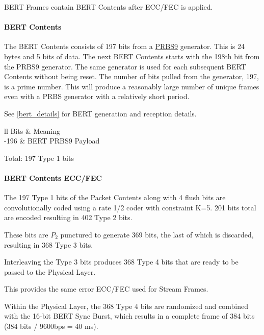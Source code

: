 \documentclass[a4paper,11pt,oneside]{book}
\begin{document}
BERT Frames contain BERT Contents after ECC/FEC is applied.

\paragraph{BERT Contents}

The BERT Contents consists of 197 bits from a \href{https://en.wikipedia.org/wiki/Pseudorandom_binary_sequence}{PRBS9} generator. This is 24 bytes and 5 bits of data. The next BERT Contents starts with the 198th bit from the PRBS9 generator. The same generator is used for each subsequent BERT Contents without being reset. The number of bits pulled from the generator, 197, is a prime number. This will produce a reasonably large number of unique frames even with a PRBS generator with a relatively short period.

See \autoref{bert_details} for BERT generation and reception details.

\begin{table}[H]
	\centering
	\begin{tblr}{ll}
		\hline
		Bits & Meaning \\
		-196 & BERT PRBS9 Payload \\
		\hline[2px]
	\end{tblr}
	\caption{BERT Contents}
\end{table}

Total: 197 Type 1 bits

\paragraph{BERT Contents ECC/FEC}

The 197 Type 1 bits of the Packet Contents along with 4 flush bits are convolutionally coded using a rate 1/2 coder with constraint K=5. 201 bits total are encoded resulting in 402 Type 2 bits.

These bits are $P_2$ punctured to generate 369 bits, the last of which is discarded, resulting in 368 Type 3 bits.

Interleaving the Type 3 bits produces 368 Type 4 bits that are ready to be passed to the Physical Layer.

This provides the same error ECC/FEC used for Stream Frames.

Within the Physical Layer, the 368 Type 4 bits are randomized and combined with the 16-bit BERT Sync Burst, which results in a complete frame of 384 bits (384 bits / 9600bps = 40 ms).
\end{document}
